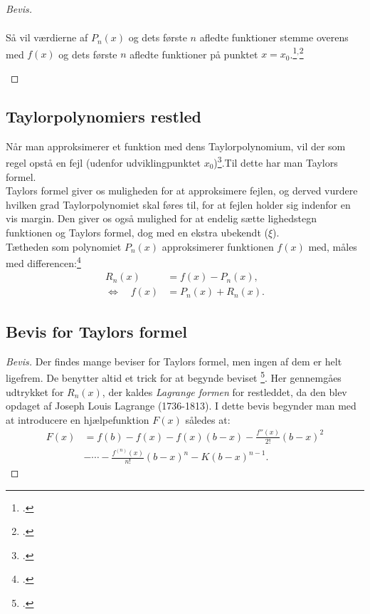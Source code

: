 \documentclass[12pt, a4paper]{article}
\begin{document}
\begin{refsection}
\begin{proof}[Bevis]
\begin{savenotes}
\begin{mdframed}
\begin{equation}
\begin{aligned}
    \end{aligned}
\end{equation}
\renewcommand{\thempfootnote}{\arabic{footnote}} 
Så vil værdierne af $P_n(x)$ og dets første $n$ afledte funktioner stemme overens med $f(x)$ og dets første $n$ afledte funktioner på punktet $x=x_0$.\footcite[s. 647-648]{calculuswithanalyticgeometry}$^,$\footcite[s.1-2]{alsholm2}%
\end{mdframed}
   \end{savenotes} 
\end{proof}
\subsection{Taylorpolynomiers restled}
Når man approksimerer et funktion med dens Taylorpolynomium, vil der som regel opstå en fejl (udenfor udviklingpunktet $x_0$)\footcite[s. 4]{alsholm1}.Til dette har man Taylors formel.\\
Taylors formel giver os muligheden for at approksimere fejlen, og derved vurdere hvilken grad Taylorpolynomiet skal føres til, for at fejlen holder sig indenfor en vis margin. Den giver os også mulighed for at endelig sætte lighedstegn funktionen og Taylors formel, dog med en ekstra ubekendt ($\xi$).\\
Tætheden som polynomiet $P_n(x)$ approksimerer funktionen $f(x)$ med, måles med differencen:\footcite[s. 650]{calculuswithanalyticgeometry}
\begin{equation}\label{restled}
    \begin{aligned}
        R_n(x)&=f(x)-P_n(x),\\
        \Leftrightarrow \quad f(x)&=P_n(x)+R_n(x).
    \end{aligned}
\end{equation}
\subsection{Bevis for Taylors formel}

\begin{proof}[Bevis]Der findes mange beviser for Taylors formel, men ingen af dem er helt ligefrem. De benytter altid et trick for at begynde beviset \footcite[A-44]{calculuswithanalyticgeometry}. Her gennemgåes udtrykket for $R_n(x)$, der kaldes \textit{Lagrange formen} for restleddet, da den blev opdaget af Joseph Louis Lagrange (1736-1813). I dette bevis begynder man med at introducere en hjælpefunktion $F(x)$ således at:
\begin{equation}\label{bevisrest1}
 \begin{aligned}
     F(x)&=f(b)-f(x)-f(x)(b-x)-\frac{f''(x)}{2!}(b-x)^2\\
         &- \cdots -\frac{f^{(n)}(x)}{n!}(b-x)^n-K(b-x)^{n-1}.
\end{aligned}
\end{equation}


\end{proof}
\end{refsection}
\end{document}
